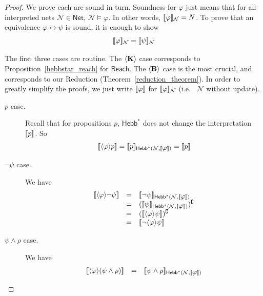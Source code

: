 \documentclass[letterpaper]{article}
\theoremstyle{definition}
\newcommand{\semantics}[1]{[\![\mbox{\em $ #1 $\/}]\!]}
\newcommand{\AllNets}{\mathsf{Net}}
\newcommand{\Net}{\mathcal{N}}
\newcommand{\Reach}{\textsf{Reach}}
\newcommand{\Hebbstar}[2]{\textsf{Hebb}^*(#1, #2)}
\newcommand{\HebbstarNoArgs}{\textsf{Hebb}^*}
\newcommand{\diaBelieveNoArgs}{\langle \textrm{\textup{\textbf{B}}} \rangle}
\newcommand{\diaKnowNoArgs}{\langle \textrm{\textup{\textbf{K}}} \rangle}
\newcommand{\diaHebbop}[1]{\langle #1\rangle}
\begin{document}
\begin{proof}
    We prove each are sound in turn.  Soundness for $\varphi$ just means that for all interpreted nets $\Net \in \AllNets$, $\Net \models \varphi$.  In other words, $\semantics{\varphi}_\Net = N$.  To prove that an equivalence $\varphi \leftrightarrow \psi$ is sound, it is enough to show
    \[ \semantics{\varphi}_\Net = \semantics{\psi}_\Net \]
    
    The first three cases are routine.  The $\diaKnowNoArgs$ case corresponds to Proposition~\ref{hebbstar_reach} for $\Reach$.  The $\diaBelieveNoArgs$ case is the most crucial, and corresponds to our Reduction (Theorem~\ref{reduction_theorem}).  In order to greatly simplify the proofs, we just write $\semantics{\varphi}$ for $\semantics{\varphi}_\Net$ (i.e.~ $\Net$ without update).

    \begin{description}
        \item[$p$ case.] Recall that for propositions $p$, $\HebbstarNoArgs$ does not change the interpretation $\semantics{p}$.  So
        \[
            \semantics{\diaHebbop{\varphi} p} = \semantics{p}_{\Hebbstar{\Net}{\semantics{\varphi}}} = \semantics{p}
        \]

        \item[$\neg \psi$ case.] We have
        \[
        \begin{array}{lcl}
            \semantics{\diaHebbop{\varphi} \neg \psi} & = &
            
            \semantics{\neg \psi}_{\Hebbstar{\Net}{\semantics{\varphi}}}\\
            
            & = & (\semantics{\psi}_{\Hebbstar{\Net}{\semantics{\varphi}}})^\complement\\

            & = & (\semantics{\diaHebbop{\varphi} \psi})^\complement\\

            & = & \semantics{\neg \diaHebbop{\varphi} \psi}
        \end{array}
        \]

        \item[$\psi \land \rho$ case.] We have
        \[
        \begin{array}{lcl}
            \semantics{\diaHebbop{\varphi} (\psi \land \rho)} & = &
            
            \semantics{\psi \land \rho}_{\Hebbstar{\Net}{\semantics{\varphi}}}\\
            

\end{array}\]
\end{description}
\end{proof}
\end{document}

